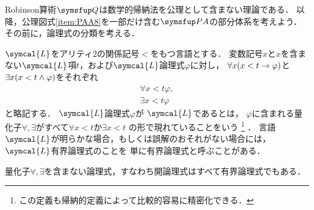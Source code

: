 Robinson算術\(\Robinson\)は数学的帰納法を公理として含まない理論である．
以降，公理図式\cref{item:PAA8}を一部だけ含む\(\PA\)の部分体系を考えよう．
その前に，論理式の分類を考える．

\begin{Def} \label{Def:boundedformula}
	\(\symcal{L}\)をアリティ2の関係記号\(<\)をもつ言語とする．
	変数記号\(x\)と\(x\)を含まない\(\symcal{L}\)項\(t\)，および\(\symcal{L}\)論理式\(\varphi\)に対し，
	\(\forall x \paren{x < t \to \varphi}\)と\(\exists x \paren{x < t \land \varphi}\)をそれぞれ
	\begin{align}
		\forall x < t \varphi,
		\label{eq:boundedformulaforall} \\
		\exists x < t \varphi
		\label{eq:boundedformulaexists}
	\end{align}
	と略記する．
	\(\symcal{L}\)論理式\(\varphi\)が%
	\(\symcal{L}\)であるとは，
	\(\varphi\)に含まれる量化子\(\forall, \exists\)がすべて\(\forall x < t\)か\(\exists x < t\)
	の形で現れていることをいう%
	\footnote{%
		この定義も帰納的定義によって比較的容易に精密化できる．
	}%
	．
	言語\(\symcal{L}\)が明らかな場合，もしくは誤解のおそれがない場合には，\(\symcal{L}\)有界論理式のことを
	単に有界論理式と呼ぶことがある．

	量化子\(\forall, \exists\)を含まない論理式，すなわち開論理式はすべて有界論理式でもある．
\end{Def}

